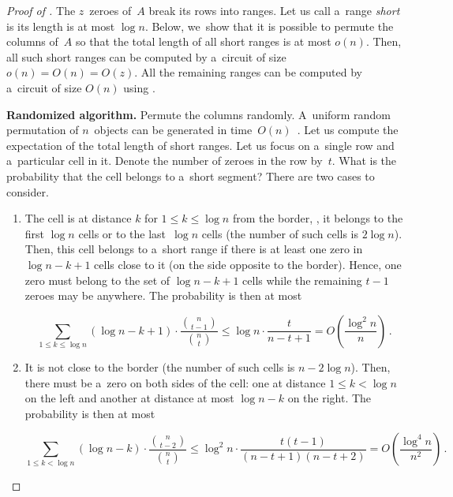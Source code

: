 \documentclass{toc}
\begin{document}
\begin{proof}[Proof of {}]
    The $z$~zeroes of~$A$ break its rows into ranges.
    Let us call a~range \emph{short} is its length is at most $\log n$.
    Below, we~show that it is possible to permute the columns of~$A$
    so that the total length of all short ranges is at most $o(n)$.
    Then, all such short ranges can be computed by a~circuit of size
    $o(n)=O(n)=O(z)$. All the remaining ranges can be
    computed by a~circuit of size $O(n)$ using .

    \textbf{Randomized algorithm.}
    Permute the columns randomly. A~uniform random permutation
    of $n$~objects can be generated in
    time~$O(n)$~\cite[Algorithm~P (Shuffling)]{DBLP:books/lib/Knuth98}.
    Let us compute the expectation of
    the total length of short ranges.
    Let us focus on a~single row and a~particular cell in it. Denote the number of
    zeroes in the row by~$t$. What is the probability that the cell belongs to
    a~short segment? There are two cases to consider.


    \begin{enumerate}
        \item The cell is at distance $k$ for $1 \le k \le \log n$ from the border,
        \ie, it belongs to the first $\log n$ cells or to the last~$\log n$ cells
        (the number of such cells is $2\log n$). Then,
        this cell belongs to a~short range if there is at least one zero
        in $\log n - k + 1$ cells close to it (on the side opposite to the border).
        Hence, one zero must belong to the set of $\log n - k + 1$ cells while the
        remaining $t-1$ zeroes may be anywhere. The probability is then at most

        \[\sum_{1 \le k \le \log n}(\log n - k + 1) \cdot \frac{\binom{n}{t-1}}{\binom{n}{t}} \le \log n \cdot \frac{t}{n-t+1}=O\left(\frac{\log^2n}{n}\right) \, .\]

        \item It is not close to the border (the number of such cells is $n-2\log n$).
        Then, there must be a~zero on both sides of the cell: one at
        distance $1 \le k < \log n$ on the left and another at distance at most
        $\log n - k$ on the right. The probability is then at most

        \[\sum_{1 \le k < \log n}(\log n - k) \cdot \frac{\binom{n}{t-2}}{\binom{n}{t}} \le \log^2n \cdot \frac{t(t-1)}{(n-t+1)(n-t+2)}=O\left(\frac{\log^4 n}{n^2}\right) \, .\]


\end{enumerate}
\end{proof}
\end{document}
